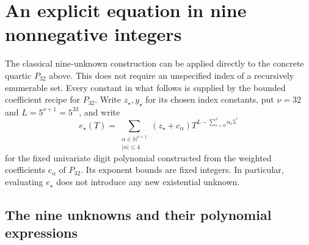 \section{An explicit equation in nine nonnegative integers}
\label{sec:nine-explicit}

The classical nine-unknown construction can be applied directly to the
concrete quartic $P_{32}$ above.  This does not require an unspecified
index of a recursively enumerable set.  Every constant in what follows
is supplied by the bounded coefficient recipe for $P_{32}$.
Write $z_\star,y_\star$ for its chosen index constants, put
$\nu=32$ and $L=5^{\nu+1}=5^{33}$, and write
\[
 e_\star(T)=\sum_{\substack{\alpha\in\mathbb N^{\nu+1}\\|\alpha|\leq4}}
       (z_\star+c_\alpha)T^{L-\sum_{r=0}^{\nu}\alpha_r5^r}
\]
for the fixed univariate digit polynomial constructed from the weighted
coefficients $c_\alpha$ of $P_{32}$.  Its exponent bounds are fixed
integers.  In particular, evaluating $e_\star$ does not introduce any
new existential unknown.

\subsection{The nine unknowns and their polynomial expressions}


